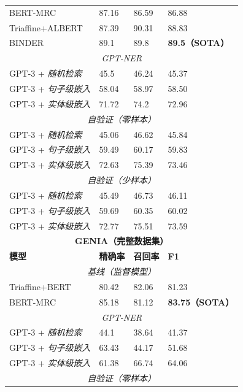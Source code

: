 \documentclass[supercite]{Experimental_Report}
\theoremstyle{definition}
\begin{document}
\begin{table}[th!]
{\begin{tabular}{llll}
        BERT-MRC \cite{li2019unified} & 87.16 & 86.59 & 86.88 \\
        Triaffine+ALBERT \cite{yuan2021fusing} & 87.39 & 90.31 & 88.83 \\
        BINDER \cite{zhang2022optimizing} & 89.1 & 89.8 & \textbf{89.5（SOTA）} \\ \midrule
        \multicolumn{4}{c}{{\it GPT-NER}} \\ \midrule
        GPT-3 + \textit{随机检索} & 45.5 & 46.24 & 45.37 \\
        GPT-3 + \textit{句子级嵌入} & 58.04 & 58.97 & 58.50 \\
        GPT-3 + \textit{实体级嵌入} & 71.72 & 74.2 & 72.96 \\ \midrule
        \multicolumn{4}{c}{{\it 自验证（零样本）}} \\ \midrule
        GPT-3 + \textit{随机检索} & 45.06 & 46.62 & 45.84 \\
        GPT-3 + \textit{句子级嵌入} & 59.49 & 60.17 & 59.83 \\
        GPT-3 + \textit{实体级嵌入} & 72.63 & 75.39 & 73.46 \\ \midrule
        \multicolumn{4}{c}{{\it 自验证（少样本）}} \\ \midrule
        GPT-3 + \textit{随机检索} & 45.49 & 46.73 & 46.11 \\
        GPT-3 + \textit{句子级嵌入} & 59.69 & 60.35 & 60.02 \\
        GPT-3 + \textit{实体级嵌入} & 72.77 & 75.51 & 73.59 \\ \midrule
        \multicolumn{4}{c}{{\bf GENIA（完整数据集）}} \\ \midrule
        \textbf{模型} & \textbf{精确率} & \textbf{召回率} & \textbf{F1} \\ \midrule
        \multicolumn{4}{c}{{\it 基线（监督模型）}} \\ \midrule
        Triaffine+BERT \cite{yuan2021fusing} & 80.42 & 82.06 & 81.23 \\
        BERT-MRC \cite{li2019unified} & 85.18 & 81.12 & \textbf{83.75（SOTA）} \\ \midrule
        \multicolumn{4}{c}{{\it GPT-NER}} \\ \midrule
        GPT-3 + \textit{随机检索} & 44.1 & 38.64 & 41.37 \\
        GPT-3 + \textit{句子级嵌入} & 63.43 & 44.17 & 51.68 \\
        GPT-3 + \textit{实体级嵌入} & 61.38 & 66.74 & 64.06 \\ \midrule
        \multicolumn{4}{c}{{\it 自验证（零样本）}} \\ \midrule

\end{tabular}}
\end{table}
\end{document}
